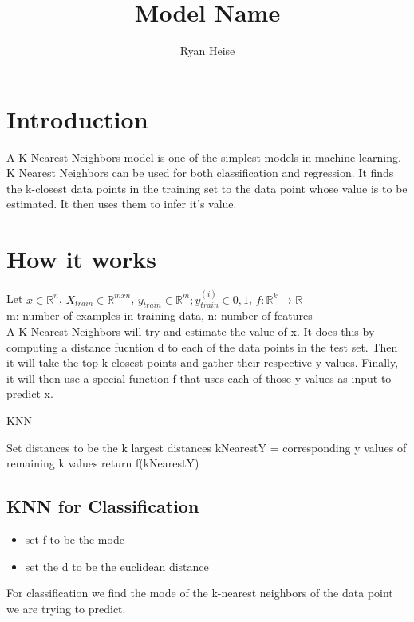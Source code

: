 \documentclass{article}
\author {Ryan Heise}
\title{Model Name}
\newcommand{\R}{\mathbb{R}}
\begin{document}
\maketitle

\section{Introduction}

A K Nearest Neighbors model is one of the simplest models in machine learning. K Nearest Neighbors can be used for 
both classification and regression. It finds the k-closest data points in the training set to the data point whose value is to be estimated.
It then uses them to infer it's value.


\section{How it works}
Let $x \in \R^{n}$, $X_{train} \in \R^{m x n}$, $y_{train} \in \R^{m}; y_{train}^{(i)} \in {0,1}$, $f: \R^{k} \rightarrow \R$\\
m: number of examples in training data, n: number of features\\

A K Nearest Neighbors will try and estimate the value of x. 
It does this by computing a distance fucntion d to each of the data points in the test set. 
Then it will take the top k closest points and gather their respective y values. 
Finally, it will then use a special function f that uses each of those y values  as input to predict x. 


\begin{algorithm}
    \caption{KNN}
    \begin{algorithmic}[1]
    \EndFor
    \State Set distances to be the k largest distances 
    \State kNearestY = corresponding y values of remaining k values 
    \State return f(kNearestY)
    \EndProcedure
\end{algorithmic}
\end{algorithm}

\subsection{KNN for Classification}
    \begin{itemize}
        \item set f to be the mode
        \item set the d to be the euclidean distance 
    \end{itemize}
    For classification we find the mode of the k-nearest neighbors of the data point we are trying to predict. 
\end{document}
